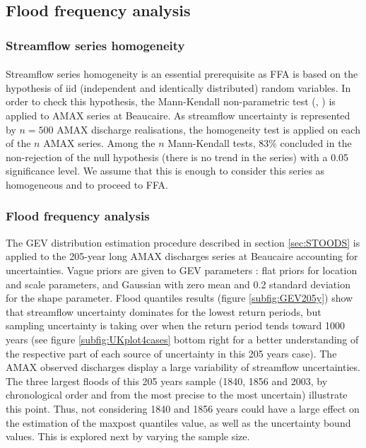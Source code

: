 \documentclass[11pt]{article}
\begin{document}
   
    \subsection{Flood frequency analysis}
    
        \subsubsection{Streamflow series homogeneity}
           
        \paragraph{}
        Streamflow series homogeneity is an essential prerequisite as FFA is based on the hypothesis of iid (independent and identically distributed) random variables. In order to check this hypothesis, the Mann-Kendall non-parametric test (\citet{mann_nonparametric_1945}, \citet{kendall_rank_1948}) is applied to AMAX series at Beaucaire. As streamflow uncertainty is represented by $n = 500$ AMAX discharge realisations, the homogeneity test is applied on each of the $n$ AMAX series. Among the $n$ Mann-Kendall tests, 83\% concluded in the non-rejection of the null hypothesis (there is no trend in the series) with a 0.05 significance level. We assume that this is enough to consider this series as homogeneous and to proceed to FFA. 
        
        \subsubsection{Flood frequency analysis}
        
       The GEV distribution estimation procedure described in section \ref{sec:STOODS} is applied to the 205-year long AMAX discharges series at Beaucaire accounting for uncertainties. Vague priors are given to GEV parameters : flat priors for location and scale parameters, and Gaussian with zero mean and 0.2 standard deviation for the shape parameter.
       Flood quantiles results (figure \ref{subfig:GEV205y}) show that streamflow uncertainty dominates for the lowest return periods, but sampling uncertainty is taking over when the return period tends toward 1000 years (see figure \ref{subfig:UKplot4cases} bottom right  for a better understanding of the respective part of each source of uncertainty in this 205 years case). The AMAX observed discharges display a large variability of streamflow uncertainties. The three largest floods of this 205 years sample (1840, 1856 and 2003, by chronological order and from the most precise to the most uncertain) illustrate this point. Thus, not considering 1840 and 1856 years could have a large effect on the estimation of the maxpost quantiles value, as well as the uncertainty bound values. This is explored next by varying the sample size.
       
\end{document}
